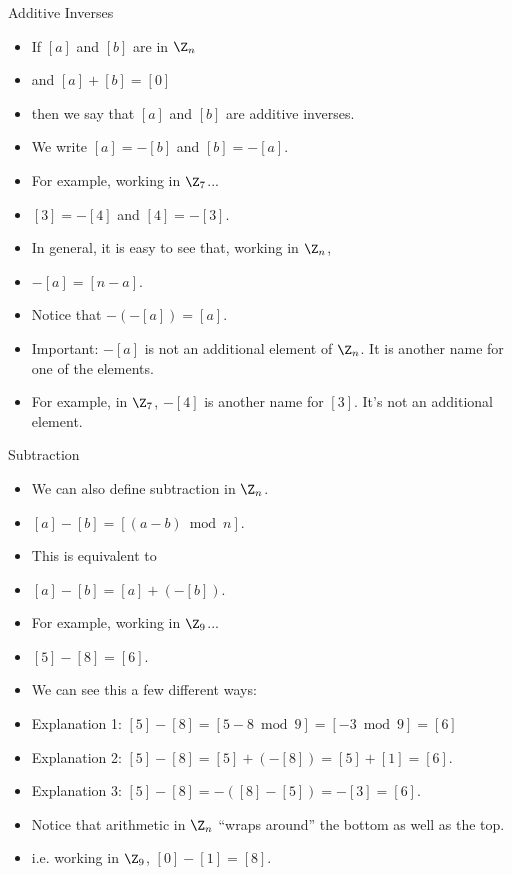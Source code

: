\documentclass{beamer}
\begin{document}
\begin{frame}{Additive Inverses}
\begin{itemize}
  \item If $[a]$ and $[b]$ are in $\Z_n$
  \item and $[a]+[b] = [0]$
  \item then we say that $[a]$ and $[b]$ are additive inverses.
  \item We write $[a] = -[b]$ and $[b] = -[a]$.
  \item For example, working in $\Z_7$...
  \item $[3] = -[4]$ and $[4] = -[3]$.
  \item In general, it is easy to see that, working in $\Z_n$,
  \item $-[a] = [n-a]$.
  \item Notice that $-(-[a]) = [a]$.
  \item Important: $-[a]$ is not an additional element of $\Z_n$. It is another name for one of the elements.
  \item For example, in $\Z_7$, $-[4]$ is another name for $[3]$. It's not an additional element.
\end{itemize}
\end{frame}

\begin{frame}{Subtraction}
\begin{itemize}
  \item We can also define subtraction in $\Z_n$.
  \item $[a] - [b] = [(a-b) \bmod n]$.
  \item This is equivalent to
  \item $[a] - [b] = [a] + (-[b])$.
  \item For example, working in $\Z_9$...
  \item $[5] - [8] = [6]$.
  \item We can see this a few different ways:
  \item Explanation 1: $[5]-[8] = [5-8 \bmod 9] = [-3 \bmod 9] = [6]$
  \item Explanation 2: $[5] - [8] = [5] + (-[8]) = [5] + [1] = [6]$.
  \item Explanation 3: $[5] - [8] = -([8] - [5]) = -[3] = [6]$.
  \item Notice that arithmetic in $\Z_n$ ``wraps around'' the bottom as well as the top.
  \item i.e. working in $\Z_9$, $[0] - [1] = [8]$.
\end{itemize}
\end{frame}
\end{document}
